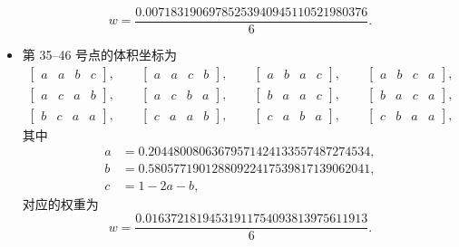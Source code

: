\begin{itemize}[wide]
\begin{equation}
w=\frac{0.00718319069785253940945110521980376}{6}.
\end{equation}
\item 第 35–46 号点的体积坐标为
\begin{equation}
\begin{gathered}\begin{bmatrix}a & a & b & c\end{bmatrix},\qquad\begin{bmatrix}a & a & c & b\end{bmatrix},\qquad\begin{bmatrix}a & b & a & c\end{bmatrix},\qquad\begin{bmatrix}a & b & c & a\end{bmatrix},\\
\begin{bmatrix}a & c & a & b\end{bmatrix},\qquad\begin{bmatrix}a & c & b & a\end{bmatrix},\qquad\begin{bmatrix}b & a & a & c\end{bmatrix},\qquad\begin{bmatrix}b & a & c & a\end{bmatrix},\\
\begin{bmatrix}b & c & a & a\end{bmatrix},\qquad\begin{bmatrix}c & a & a & b\end{bmatrix},\qquad\begin{bmatrix}c & a & b & a\end{bmatrix},\qquad\begin{bmatrix}c & b & a & a\end{bmatrix},
\end{gathered}
\end{equation}
其中
\begin{equation}
\begin{aligned}a & =0.20448008063679571424133557487274534,\\
b & =0.58057719012880922417539817139062041,\\
c & =1-2a-b,
\end{aligned}
\end{equation}
对应的权重为
\begin{equation}
w=\frac{0.01637218194531911754093813975611913}{6}.
\end{equation}
\end{itemize}
%

